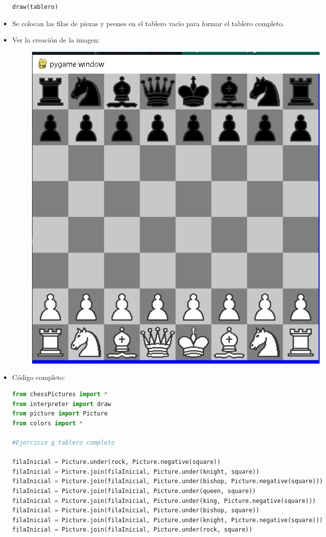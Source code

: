 \documentclass{article}
\begin{document}
\begin{itemize}
\begin{lstlisting}[language=Python, caption={Tablero completo con piezas}, float=H]
draw(tablero)
    \end{lstlisting}
    \item Se colocan las filas de piezas y peones en el tablero vacío para formar el tablero completo.
    \item Ver la creación de la imagen:
	\begin{figure}[H]
		\centering
		\includegraphics[scale=0.3]{img/tablerro_Ajedres.jpg}
	\end{figure}
    \item Código completo:
    \begin{lstlisting}[language=Python, caption={Código completo}, float=H]
from chessPictures import *
from interpreter import draw
from picture import Picture
from colors import *

#Ejercicio g tablero completo

filaInicial = Picture.under(rock, Picture.negative(square))
filaInicial = Picture.join(filaInicial, Picture.under(knight, square))
filaInicial = Picture.join(filaInicial, Picture.under(bishop, Picture.negative(square)))
filaInicial = Picture.join(filaInicial, Picture.under(queen, square))
filaInicial = Picture.join(filaInicial, Picture.under(king, Picture.negative(square)))
filaInicial = Picture.join(filaInicial, Picture.under(bishop, square))
filaInicial = Picture.join(filaInicial, Picture.under(knight, Picture.negative(square)))
filaInicial = Picture.join(filaInicial, Picture.under(rock, square))


\end{lstlisting}
\end{itemize}
\end{document}
